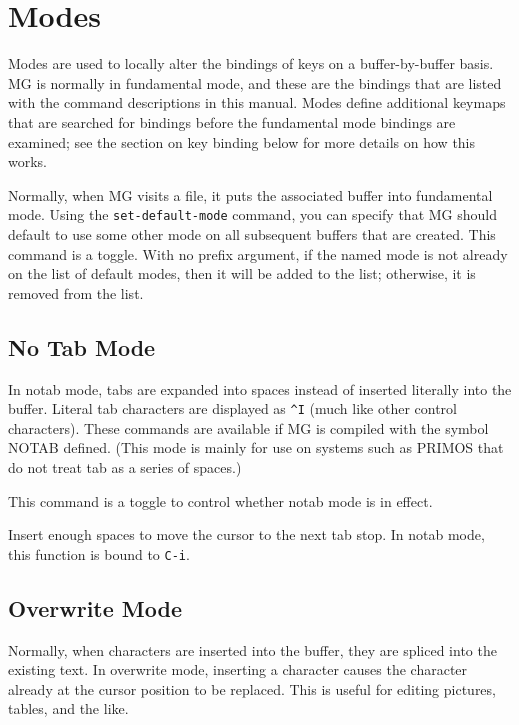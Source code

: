\chapter{Modes}

Modes are used to locally alter the bindings of keys on a 
buffer-by-buffer basis.  MG is normally in fundamental mode, and these
are the bindings that are listed with the command descriptions in 
this manual.  Modes define additional keymaps that are searched for
bindings before the fundamental mode bindings are examined; see the
section on key binding below for more details on how this works.

\fbody Normally, when MG visits a file, it puts the associated buffer
into fundamental mode.  Using the {\tt set-default-mode} command, you
can specify that MG should default to use some other mode on all subsequent
buffers that are created.  This command is a toggle.  With no prefix
argument, if the named mode is not already on the list of
default modes, then it will be added to the list; otherwise, it is removed
from the list.

\section{No Tab Mode}

In notab mode, tabs are expanded into spaces instead of inserted
literally into the buffer.  Literal tab characters are displayed as
\verb"^I" (much like other control characters).  These commands are
available if MG is compiled with the symbol NOTAB defined.  (This mode
is mainly for use on systems such as PRIMOS that do not treat tab as a
series of spaces.)

\fbody This command is a toggle to control whether notab mode is in effect.

\fbody Insert enough spaces to move the cursor to the next tab stop.  In
notab mode, this function is bound to {\tt C-i}.


\section{Overwrite Mode}

Normally, when characters are inserted into the buffer, they are spliced
into the existing text.  In overwrite mode, inserting a character causes
the character already at the cursor position to be replaced.  This is
useful for editing pictures, tables, and the like.

